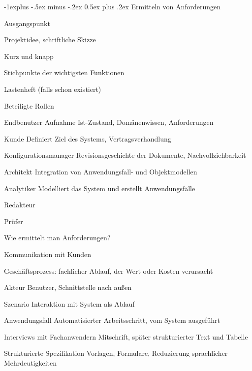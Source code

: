 \documentclass[a4paper]{article}
\makeatletter
\renewcommand{\subsection}{\@startsection{subsection}{2}{0mm}%
                                {-1explus -.5ex minus -.2ex}%
                                {0.5ex plus .2ex}%
                                {\normalfont\normalsize\bfseries}}
\makeatother
\begin{document}
\begin{multicols}{3}
  \subsection{Ermitteln von Anforderungen}
  \begin{itemize*}
    \item Ausgangspunkt
    \begin{itemize*}
      \item Projektidee, schriftliche Skizze
      \item Kurz und knapp
      \item Stichpunkte der wichtigsten Funktionen
      \item Lastenheft (falls schon existiert)
    \end{itemize*}
    \item Beteiligte Rollen
    \begin{description*}
      \item[Endbenutzer] Aufnahme Ist-Zustand, Domänenwissen, Anforderungen
      \item[Kunde] Definiert Ziel des Systems, Vertragsverhandlung
      \item[Konfigurationsmanager] Revisionsgeschichte der Dokumente, Nachvollziehbarkeit
      \item[Architekt] Integration von Anwendungsfall- und Objektmodellen
      \item[Analytiker] Modelliert das System und erstellt Anwendungsfälle
      \item[Redakteur]
      \item[Prüfer]
    \end{description*}
    \item Wie ermittelt man Anforderungen?
    \begin{itemize*}
      \item Kommunikation mit Kunden
      \item Geschäftsprozess: fachlicher Ablauf, der Wert oder Kosten verursacht
      \begin{description*}
        \item[Akteur] Benutzer, Schnittstelle nach außen
        \item[Szenario] Interaktion mit System als Ablauf
        \item[Anwendungsfall] Automatisierter Arbeitsschritt, vom System ausgeführt
        \item[Interviews mit Fachanwendern] Mitschrift, später strukturierter Text und Tabelle
        \item[Strukturierte Spezifikation] Vorlagen, Formulare, Reduzierung sprachlicher Mehrdeutigkeiten

\end{description*}
\end{itemize*}
\end{itemize*}
\end{multicols}
\end{document}
